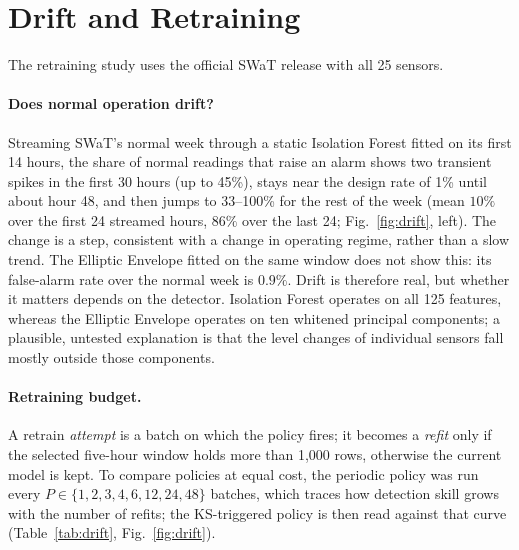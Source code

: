 \documentclass[11pt]{article}
\begin{document}
\section{Drift and Retraining}
\label{sec:drift}

The retraining study uses the official SWaT release with all 25 sensors.

\paragraph{Does normal operation drift?} Streaming SWaT's normal week through a static
Isolation Forest fitted on its first 14 hours, the share of normal readings that raise an
alarm shows two transient spikes in the first 30 hours (up to 45\%), stays near the design
rate of 1\% until about hour 48, and then jumps to 33--100\% for the rest of the week (mean
$10\%$ over the first 24 streamed hours, $86\%$ over the last 24; Fig.~\ref{fig:drift},
left). The change is a step, consistent with a change in operating regime, rather than a
slow trend. The Elliptic Envelope fitted on the same window does not show this: its
false-alarm rate over the normal week is $0.9\%$. Drift is therefore real, but whether it
matters depends on the detector. Isolation Forest operates on all 125 features, whereas the
Elliptic Envelope operates on ten whitened principal components; a plausible, untested
explanation is that the level changes of individual sensors fall mostly outside those
components.

\paragraph{Retraining budget.} A retrain \emph{attempt} is a batch on which the policy
fires; it becomes a \emph{refit} only if the selected five-hour window holds more than
1{,}000 rows, otherwise the current model is kept. To compare policies at equal cost, the
periodic policy was run every $P\in\{1,2,3,4,6,12,24,48\}$ batches, which traces how
detection skill grows with the number of refits; the KS-triggered policy is then read
against that curve (Table~\ref{tab:drift}, Fig.~\ref{fig:drift}).
\end{document}
